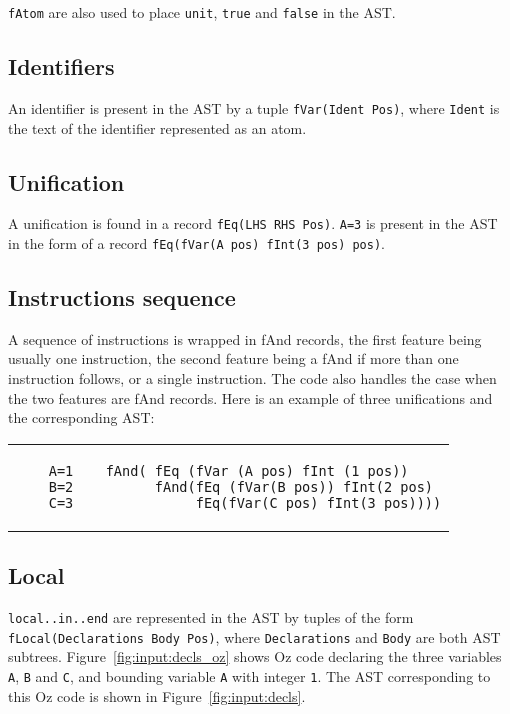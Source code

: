 \documentclass[a4paper]{memoir}
\begin{document}
\lstinline!fAtom! are also used to place \lstinline!unit!, \lstinline!true! and
\lstinline!false! in the AST.

\subsection{Identifiers}\label{sec:input:identifiers}
An identifier is present in the AST by a tuple \lstinline!fVar(Ident Pos)!,
where \lstinline!Ident! is the text of the identifier represented as an atom.

\subsection{Unification}
A unification is found in a record \lstinline!fEq(LHS RHS Pos)!.
\lstinline!A=3! is present in the AST in the form of a record
\lstinline!fEq(fVar(A pos) fInt(3 pos) pos)!.

\subsection{Instructions sequence}
A sequence of instructions is wrapped in fAnd records, the first feature being usually one instruction, the second feature being a fAnd if more than one instruction follows,  or a single instruction. The code also handles the case when the two features are fAnd records. %
Here is an example of three unifications and the corresponding AST:\\
\begin{tabular}{ p{} p{} }
  \begin{lstlisting}
    A=1
    B=2
    C=3
  \end{lstlisting}
&
  \footnotesize{
  \begin{lstlisting}
  fAnd( fEq (fVar (A pos) fInt (1 pos))
        fAnd(fEq (fVar(B pos)) fInt(2 pos) 
             fEq(fVar(C pos) fInt(3 pos))))
  \end{lstlisting}
  }
\end{tabular}

\subsection{Local}\label{sec:input:flocal}
\lstinline!local..in..end! are represented in the AST by tuples of the form
\lstinline!fLocal(Declarations Body Pos)!, where \lstinline!Declarations! and
\lstinline!Body! are both AST subtrees. 
Figure~\ref{fig:input:decls_oz} shows Oz code declaring the three variables
\lstinline!A!, \lstinline!B!
and \lstinline!C!, and bounding variable \lstinline!A! with integer
\lstinline!1!. The AST corresponding to this Oz code is shown in
Figure~\ref{fig:input:decls}.
\end{document}
